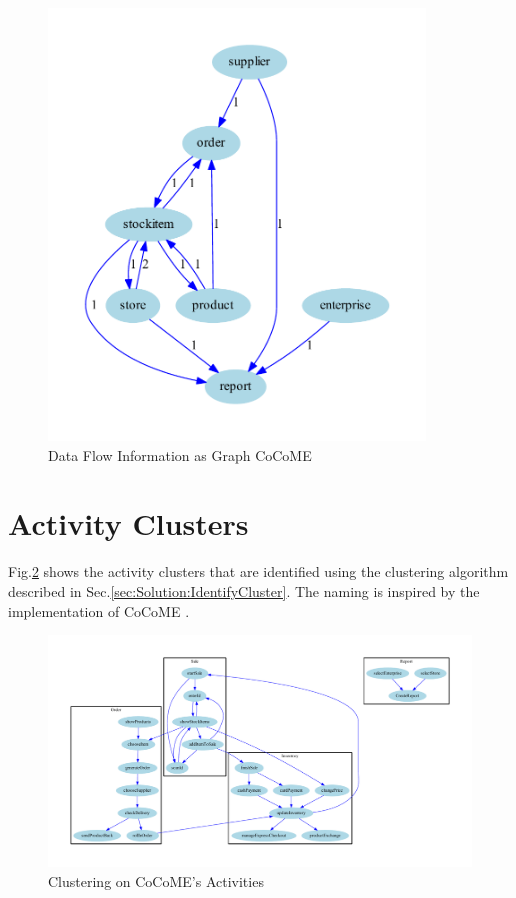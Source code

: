 \begin{figure}[h!]
	\centering
	\includegraphics[width=10cm, trim={1cm 0cm 2cm 0cm}]{img/CoCoMEDataFlowGraph.pdf}
	\caption{Data Flow Information as Graph CoCoME}
	\label{fig:CoCoMEDataFlowGraph}
\end{figure}

\pagebreak

\section{Activity Clusters}
\label{sec:SolutionApplication:ActivityCluster}
Fig.\ref{fig:CoCoMEActivityCluster} shows the activity clusters that are identified using the clustering algorithm described in Sec.\ref{sec:Solution:IdentifyCluster}. The naming is inspired by the implementation of CoCoME \cite{NikoCoCoMEImpl}.

\begin{figure}[h!]
	\centering
	\begin{sideways}
		\includegraphics[width=19.0cm, trim={1.5cm 0cm 1.8cm 0cm}]{img/CoCoMEActivityCluster.pdf}
	\end{sideways}
	
	\caption{Clustering on CoCoME's Activities}
	\label{fig:CoCoMEActivityCluster}
\end{figure}

